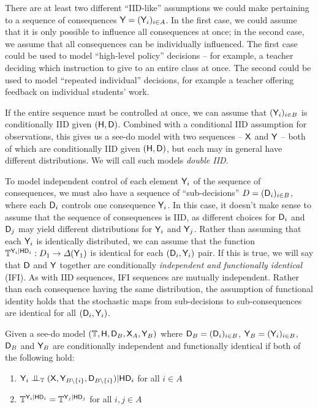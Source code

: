 There are at least two different ``IID-like'' assumptions we could make pertaining to a sequence of consequences $\mathsf{Y}=(\mathsf{Y}_i)_{i\in A}$. In the first case, we could assume that it is only possible to influence all consequences at once; in the second case, we assume that all consequences can be individually influenced. The first case could be used to model ``high-level policy'' decisions -- for example, a teacher deciding which instruction to give to an entire class at once. The second could be used to model ``repeated individual'' decisions, for example a teacher offering feedback on individual students' work.

If the entire sequence must be controlled at once, we can assume that $(\mathsf{Y}_i)_{i\in B}$ is conditionally IID given $(\mathsf{H},\mathsf{D})$. Combined with a conditional IID assumption for observations, this gives us a see-do model with two sequences -- $\mathsf{X}$ and $\mathsf{Y}$ -- both of which are conditionally IID given $(\mathsf{H},\mathsf{D})$, but each may in general have different distributions. We will call such models \emph{double IID}.

To model independent control of each element $\mathsf{Y}_i$ of the sequence of consequences, we must also have a sequence of ``sub-decisions'' $D=(\mathsf{D}_i)_{i\in B}$, where each $\mathsf{D}_i$ controls one consequence $\mathsf{Y}_i$. In this case, it doesn't make sense to assume that the sequence of consequences is IID, as different choices for $\mathsf{D}_i$ and $\mathsf{D}_j$ may yield different distributions for $\mathsf{Y}_i$ and $\mathsf{Y}_j$. Rather than assuming that each $\mathsf{Y}_i$ is identically distributed, we can assume that the function $\mathbb{T}^{\mathsf{Y}_i|\mathsf{H}\mathsf{D}_i}:D_1\to \Delta(\mathsf{Y}_1)$ is identical for each $(\mathsf{D}_i,\mathsf{Y}_i)$ pair. If this is true, we will say that $\mathsf{D}$ and $\mathsf{Y}$ together are conditionally \emph{independent and functionally identical} (IFI). As with IID sequences, IFI sequences are mutually independent. Rather than each consequence having the same distribution, the assumption of functional identity holds that the stochastic maps from sub-decisions to sub-consequences are identical for all $(\mathsf{D}_i,\mathsf{Y}_i)$.

\begin{definition}\label{def:ciid_cifi}
Given a see-do model $(\mathbb{T},\mathsf{H},\mathsf{D}_B,\mathsf{X}_A,\mathsf{Y}_B)$ where $\mathsf{D}_B=(\mathsf{D}_i)_{i\in B}$, $\mathsf{Y}_B=(\mathsf{Y}_i)_{i\in B}$, $\mathsf{D}_B$ and $\mathsf{Y}_B$ are conditionally independent and functionally identical if both of the following hold:
\begin{enumerate}
    \item $\RV{Y}_i\CI_{\kernel{T}} (\RV{X},\RV{Y}_{B\setminus \{i\}},\RV{D}_{B\setminus \{i\}})|\RV{H}\RV{D}_i$ for all $i\in A$
    \item $\mathbb{T}^{\mathsf{Y}_i|\mathsf{H}\mathsf{D}_i} = \mathbb{T}^{\mathsf{Y}_j|\mathsf{H}\mathsf{D}_j}$ for all $i,j\in A$
\end{enumerate}
\end{definition}

